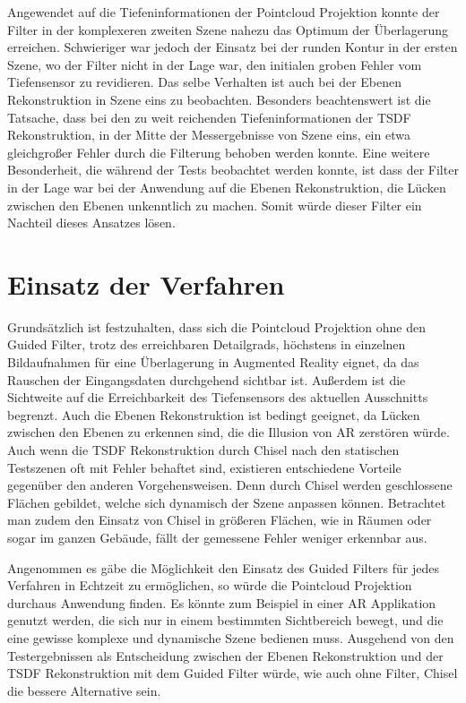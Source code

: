 Angewendet auf die Tiefeninformationen der Pointcloud Projektion konnte der Filter in der komplexeren zweiten Szene nahezu das Optimum der Überlagerung erreichen. Schwieriger war jedoch der Einsatz bei der runden Kontur in der ersten Szene, wo der Filter nicht in der Lage war, den initialen groben Fehler vom Tiefensensor zu revidieren. Das selbe Verhalten ist auch bei der Ebenen Rekonstruktion in Szene eins zu beobachten. Besonders beachtenswert ist die Tatsache, dass bei den zu weit reichenden Tiefeninformationen der TSDF Rekonstruktion, in der Mitte der Messergebnisse von Szene eins, ein etwa gleichgroßer Fehler durch die Filterung behoben werden konnte. Eine weitere Besonderheit, die während der Tests beobachtet werden konnte, ist dass der Filter in der Lage war bei der Anwendung auf die Ebenen Rekonstruktion, die Lücken zwischen den Ebenen unkenntlich zu machen. Somit würde dieser Filter ein Nachteil dieses Ansatzes lösen.

\section{Einsatz der Verfahren}

Grundsätzlich ist festzuhalten, dass sich die Pointcloud Projektion ohne den Guided Filter, trotz des erreichbaren Detailgrads, höchstens in einzelnen Bildaufnahmen für eine Überlagerung in Augmented Reality eignet, da das Rauschen der Eingangsdaten durchgehend sichtbar ist. Außerdem ist die Sichtweite auf die Erreichbarkeit des Tiefensensors des aktuellen Ausschnitts begrenzt. Auch die Ebenen Rekonstruktion ist bedingt geeignet, da Lücken zwischen den Ebenen zu erkennen sind, die die Illusion von AR zerstören würde. Auch wenn die TSDF Rekonstruktion durch Chisel nach den statischen Testszenen oft mit Fehler behaftet sind, existieren entschiedene Vorteile gegenüber den anderen Vorgehensweisen. Denn durch Chisel werden geschlossene Flächen gebildet, welche sich dynamisch der Szene anpassen können. Betrachtet man zudem den Einsatz von Chisel in größeren Flächen, wie in Räumen oder sogar im ganzen Gebäude, fällt der gemessene Fehler weniger erkennbar aus.

Angenommen es gäbe die Möglichkeit den Einsatz des Guided Filters für jedes Verfahren in Echtzeit zu ermöglichen, so würde die Pointcloud Projektion durchaus Anwendung finden. Es könnte zum Beispiel in einer AR Applikation genutzt werden, die sich nur in einem bestimmten Sichtbereich bewegt, und die eine gewisse komplexe und dynamische Szene bedienen muss. Ausgehend von den Testergebnissen als Entscheidung zwischen der Ebenen Rekonstruktion und der TSDF Rekonstruktion mit dem Guided Filter würde, wie auch ohne Filter, Chisel die bessere Alternative sein.


